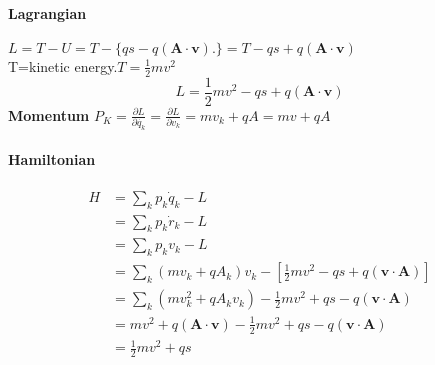\paragraph{Lagrangian }
$L=T-U=T-\{q s-q(\mathbf{A} \cdot \mathbf{v}) .\}=T-q s+q(\mathbf{A} \cdot \mathbf{v})$\\
T=kinetic energy.$T=\frac{1}{2}mv^2$
$$L=\frac{1}{2}mv^2-q s+q(\mathbf{A} \cdot \mathbf{v})$$
\textbf{Momentum} $P_K=\frac{\partial L}{\partial \dot{q_k}}=\frac{\partial L}{\partial v_k}=mv_k+qA=mv+qA$\\
\paragraph{Hamiltonian}
$$\begin{aligned}
H &=\sum_{k} p_{k} \dot{q}_{k}-L \\
&=\sum_{k} p_{k} \dot{r}_{k}-L \\
&=\sum_{k} p_{k} v_{k}-L \\
&=\sum_{k}\left(m v_{k}+q A_{k}\right) v_{k}-\left[\frac{1}{2} m v^{2}-q s+q(\mathbf{v} \cdot \mathbf{A})\right] \\
&=\sum_{k}\left(m v_{k}^{2}+q A_{k} v_{k}\right)-\frac{1}{2} m v^{2}+q s-q(\mathbf{v} \cdot \mathbf{A}) \\
&=m v^{2}+q(\mathbf{A} \cdot \mathbf{v})-\frac{1}{2} m v^{2}+q s-q(\mathbf{v} \cdot \mathbf{A}) \\
&=\frac{1}{2} m v^{2}+q s
\end{aligned}$$

